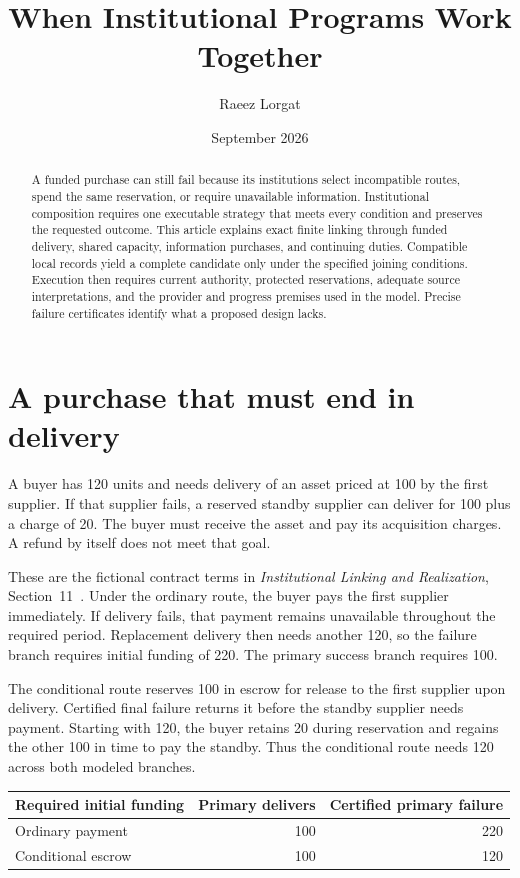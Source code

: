 \documentclass{momentum}
\title{When Institutional Programs Work Together}
\author{Raeez Lorgat}
\date{September 2026}
\begin{document}
\maketitle

\begin{abstract}
A funded purchase can still fail because its institutions select incompatible routes, spend the same reservation, or require unavailable information.
Institutional composition requires one executable strategy that meets every condition and preserves the requested outcome.
This article explains exact finite linking through funded delivery, shared capacity, information purchases, and continuing duties.
Compatible local records yield a complete candidate only under the specified joining conditions.
Execution then requires current authority, protected reservations, adequate source interpretations, and the provider and progress premises used in the model.
Precise failure certificates identify what a proposed design lacks.
\end{abstract}

\section{A purchase that must end in delivery}
\label{sec:purchase}

A buyer has 120 units and needs delivery of an asset priced at 100 by the first supplier.
If that supplier fails, a reserved standby supplier can deliver for 100 plus a charge of 20.
The buyer must receive the asset and pay its acquisition charges.
A refund by itself does not meet that goal.

These are the fictional contract terms in \emph{Institutional Linking and Realization}, Section~11~\cite{linking}.
Under the ordinary route, the buyer pays the first supplier immediately. If delivery fails, that payment remains unavailable throughout the required period.
Replacement delivery then needs another 120, so the failure branch requires initial funding of 220. The primary success branch requires 100.

The conditional route reserves 100 in escrow for release to the first supplier upon delivery.
Certified final failure returns it before the standby supplier needs payment.
Starting with 120, the buyer retains 20 during reservation and regains the other 100 in time to pay the standby.
Thus the conditional route needs 120 across both modeled branches.

\begin{center}
\begin{tabular}{lrr}
\toprule
Required initial funding & Primary delivers & Certified primary failure\\
\midrule
Ordinary payment & 100 & 220\\
Conditional escrow & 100 & 120\\
\bottomrule
\end{tabular}
\end{center}
\end{document}
